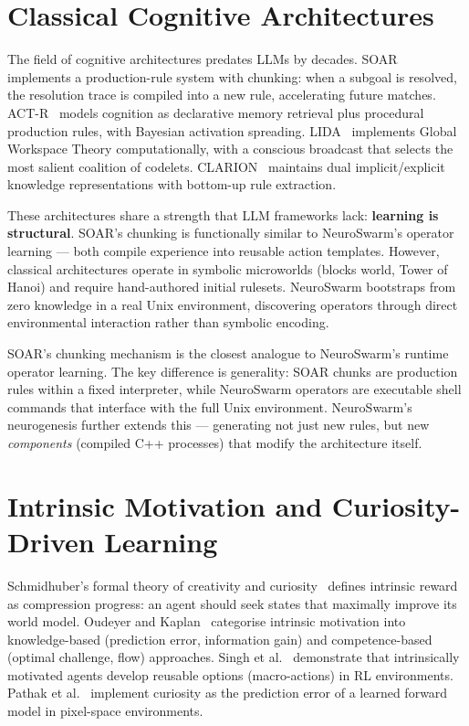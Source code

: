 \documentclass[12pt,a4paper]{report}
\begin{document}
\section{Classical Cognitive Architectures}

The field of cognitive architectures predates LLMs by decades. SOAR~\cite{laird2012soar} implements a production-rule system with chunking: when a subgoal is resolved, the resolution trace is compiled into a new rule, accelerating future matches. ACT-R~\cite{anderson2007actr} models cognition as declarative memory retrieval plus procedural production rules, with Bayesian activation spreading. LIDA~\cite{franklin2012lida} implements Global Workspace Theory computationally, with a conscious broadcast that selects the most salient coalition of codelets. CLARION~\cite{sun2006clarion} maintains dual implicit/explicit knowledge representations with bottom-up rule extraction.

These architectures share a strength that LLM frameworks lack: \textbf{learning is structural}. SOAR's chunking is functionally similar to NeuroSwarm's operator learning --- both compile experience into reusable action templates. However, classical architectures operate in symbolic microworlds (blocks world, Tower of Hanoi) and require hand-authored initial rulesets. NeuroSwarm bootstraps from zero knowledge in a real Unix environment, discovering operators through direct environmental interaction rather than symbolic encoding.

SOAR's chunking mechanism is the closest analogue to NeuroSwarm's runtime operator learning. The key difference is generality: SOAR chunks are production rules within a fixed interpreter, while NeuroSwarm operators are executable shell commands that interface with the full Unix environment. NeuroSwarm's neurogenesis further extends this --- generating not just new rules, but new \emph{components} (compiled C++ processes) that modify the architecture itself.

\section{Intrinsic Motivation and Curiosity-Driven Learning}

Schmidhuber's formal theory of creativity and curiosity~\cite{schmidhuber2010formal} defines intrinsic reward as compression progress: an agent should seek states that maximally improve its world model. Oudeyer and Kaplan~\cite{oudeyer2007intrinsic} categorise intrinsic motivation into knowledge-based (prediction error, information gain) and competence-based (optimal challenge, flow) approaches. Singh et al.~\cite{singh2005intrinsically} demonstrate that intrinsically motivated agents develop reusable options (macro-actions) in RL environments. Pathak et al.~\cite{pathak2017curiosity} implement curiosity as the prediction error of a learned forward model in pixel-space environments.
\end{document}
